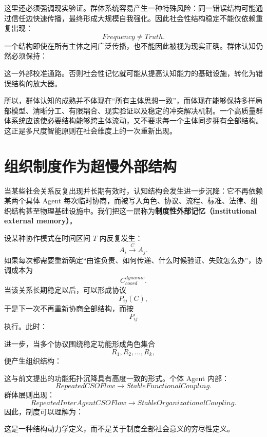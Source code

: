 这里还必须强调现实验证。群体系统容易产生一种特殊风险：同一错误结构可能通过信任边快速传播，最终形成大规模自我强化。因此社会性结构稳定不能仅依赖重复出现：
\[
Frequency\neq Truth.
\]
一个结构即使在所有主体之间广泛传播，也不能因此被视为现实正确。群体认知仍然必须保持：
\begin{statementbox}
\centering
{}
\end{statementbox}
这一外部校准通路。否则社会性记忆就可能从提高认知能力的基础设施，转化为错误结构的放大器。

所以，群体认知的成熟并不体现在``所有主体思想一致''，而体现在能够保持多样局部模型、清晰分工、有限耦合、现实验证以及稳定的冲突解决机制。一个高质量群体系统应该使必要结构能够跨主体流动，又不要求每一个主体同步拥有全部结构。这正是多尺度智能原则在社会维度上的一次重新出现。

\section{组织制度作为超慢外部结构}

当某些社会关系反复出现并长期有效时，认知结构会发生进一步沉降：它不再依赖某两个具体 Agent 每次临时协商，而被写入角色、协议、流程、标准、法律、组织结构甚至物理基础设施中。我们把这一层称为\textbf{制度性外部记忆（institutional external memory）}。

设某种协作模式在时间区间 $T$ 内反复发生：
\[
A_i
\xrightarrow{C}
A_j.
\]
如果每次都需要重新确定``由谁负责、如何传递、什么时候验证、失败怎么办''，协调成本为
\[
C_{coord}^{dynamic}.
\]
当该关系长期稳定以后，可以形成协议
\[
P_{ij}(C),
\]
于是下一次不再重新协商全部结构，而按
\[
P_{ij}
\]
执行。此时：
\begin{statementbox}
\centering
{}
\end{statementbox}
进一步，当多个协议围绕稳定功能形成角色集合
\[
R_1,R_2,\ldots,R_k,
\]
便产生组织结构：
\begin{statementbox}
\centering
{}
\end{statementbox}

这与前文提出的功能拓扑沉降具有高度一致的形式。个体 Agent 内部：
\[
RepeatedCSOFlow
\rightarrow
StableFunctionalCoupling.
\]
群体层则出现：
\[
RepeatedInterAgentCSOFlow
\rightarrow
StableOrganizationalCoupling.
\]
因此，制度可以理解为：
\begin{statementbox}
\centering
{}
\end{statementbox}
这是一种结构动力学定义，而不是关于制度全部社会意义的穷尽性定义。

